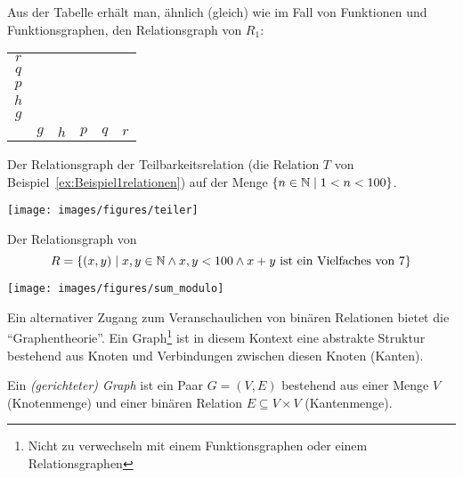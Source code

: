 \begin{bsp}
\begin{center}
    \end{center}
    Aus der Tabelle erhält man, ähnlich (gleich) wie im Fall von Funktionen und
    Funktionsgraphen, den Relationsgraph von $R_1$:
    \begin{center}
    \begin{tabular}{ c | c c c c c }
    $r$&&&&&\cellcolor{black}\\
    $q$&&&\cellcolor{black}&\cellcolor{black}&\\
    $p$&&&\cellcolor{black}&\cellcolor{black}&\\
    $h$&\cellcolor{black}&\cellcolor{black}&&&\\
    $g$&\cellcolor{black}&\cellcolor{black}&&&\\
    \hline
    &$g$&$h$&$p$&$q$&$r$
    \end{tabular}
    \end{center}
\end{bsp}

\begin{bsp}
    Der Relationsgraph der Teilbarkeitsrelation (die Relation
    $T$ von Beispiel~\ref{ex:Beispiel1relationen}) auf der Menge $\{n\in\mathbb{N}\mid 1<n<100 \}$.
    \begin{center}
    \texttt{[image: images/figures/teiler]}
    \end{center}
    Der Relationsgraph von
    \[
    R=\{(x,y)\mid x,y\in\mathbb{N}\land x,y<100\land x+y\text{ ist ein Vielfaches von }7 \}
    \]
    \begin{center}
    \texttt{[image: images/figures/sum\_modulo]}
    \end{center}
\end{bsp}


Ein alternativer Zugang zum Veranschaulichen von binären Relationen bietet die ``Graphentheorie''. Ein Graph\footnote{Nicht zu verwechseln mit einem Funktionsgraphen oder einem
Relationsgraphen} ist in diesem Kontext eine abstrakte Struktur bestehend aus Knoten und Verbindungen zwischen diesen Knoten (Kanten).

\begin{df}
    Ein \textit{(gerichteter) Graph} ist ein Paar $G=(V,E)$ bestehend aus einer Menge $V$ (Knotenmenge)
    und einer binären Relation $E\subseteq V\times V$ (Kantenmenge).
\end{df}

